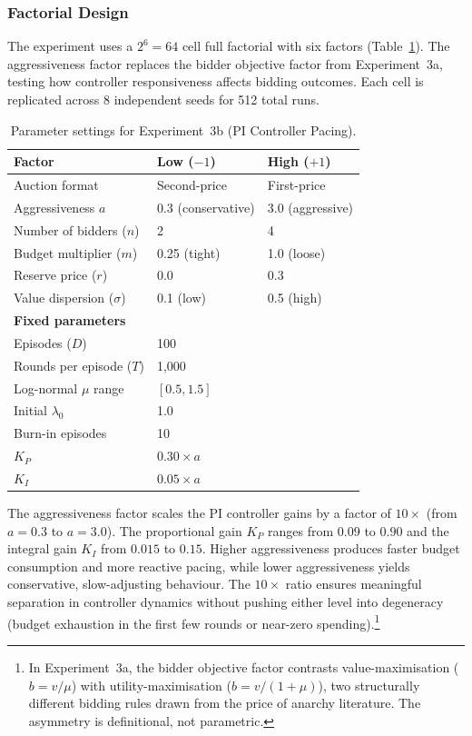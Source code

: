\subsubsection{Factorial Design}

The experiment uses a $2^6 = 64$ cell full factorial with six factors (Table~\ref{tab:exp3b_params}). The aggressiveness factor replaces the bidder objective factor from Experiment~3a, testing how controller responsiveness affects bidding outcomes. Each cell is replicated across 8 independent seeds for 512 total runs.

\begin{table}[H]
\centering
\caption{Parameter settings for Experiment~3b (PI Controller Pacing).}
\label{tab:exp3b_params}
\begin{tabular}{l l l}
\toprule
\textbf{Factor} & \textbf{Low ($-1$)} & \textbf{High ($+1$)}\\
\midrule
Auction format & Second-price & First-price \\
Aggressiveness $a$ & 0.3 (conservative) & 3.0 (aggressive) \\
Number of bidders ($n$) & 2 & 4 \\
Budget multiplier ($m$) & 0.25 (tight) & 1.0 (loose) \\
Reserve price ($r$) & 0.0 & 0.3 \\
Value dispersion ($\sigma$) & 0.1 (low) & 0.5 (high) \\
\midrule
\multicolumn{3}{l}{\textbf{Fixed parameters}} \\
\midrule
Episodes ($D$) & \multicolumn{2}{l}{100} \\
Rounds per episode ($T$) & \multicolumn{2}{l}{1{,}000} \\
Log-normal $\mu$ range & \multicolumn{2}{l}{$[0.5, 1.5]$} \\
Initial $\lambda_0$ & \multicolumn{2}{l}{1.0} \\
Burn-in episodes & \multicolumn{2}{l}{10} \\
$K_P$ & \multicolumn{2}{l}{$0.30 \times a$} \\
$K_I$ & \multicolumn{2}{l}{$0.05 \times a$} \\
\bottomrule
\end{tabular}
\end{table}

The aggressiveness factor scales the PI controller gains by a factor of $10\times$ (from $a = 0.3$ to $a = 3.0$). The proportional gain $K_P$ ranges from $0.09$ to $0.90$ and the integral gain $K_I$ from $0.015$ to $0.15$. Higher aggressiveness produces faster budget consumption and more reactive pacing, while lower aggressiveness yields conservative, slow-adjusting behaviour. The $10\times$ ratio ensures meaningful separation in controller dynamics without pushing either level into degeneracy (budget exhaustion in the first few rounds or near-zero spending).\footnote{In Experiment~3a, the bidder objective factor contrasts value-maximisation ($b = v/\mu$) with utility-maximisation ($b = v/(1+\mu)$), two structurally different bidding rules drawn from the price of anarchy literature. The asymmetry is definitional, not parametric.}


